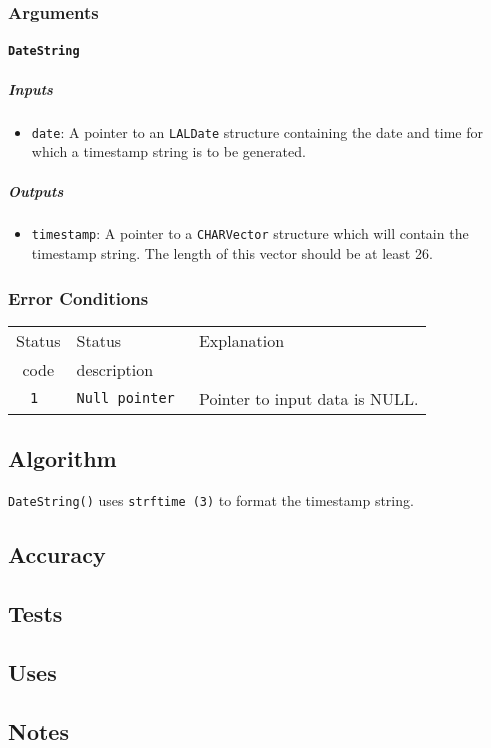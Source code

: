 \subsubsection{Arguments}

\paragraph{\texttt{DateString}}

\subparagraph{Inputs}

\begin{itemize}
    \item \texttt{date}: A pointer to an \texttt{LALDate} structure
        containing the date and time for which a timestamp string is to be
        generated.
\end{itemize}

\subparagraph{Outputs}

\begin{itemize}
    \item \texttt{timestamp}: A pointer to a \texttt{CHARVector} structure
    which will contain the timestamp string.  The length of this vector
    should be at least 26.
\end{itemize}

\subsubsection{Error Conditions}
\begin{tabular}{|c|l|l|}
  \hline
  Status & Status       & Explanation \\
  code   & description  &             \\
  \hline
  \tt 1  & \tt Null pointer & Pointer to input data is NULL. \\
  \hline
\end{tabular}

\subsection{Algorithm}

\texttt{DateString()} uses \texttt{strftime (3)} to format the timestamp
string. 

\subsection{Accuracy}

\subsection{Tests}

\subsection{Uses}


\subsection{Notes}



